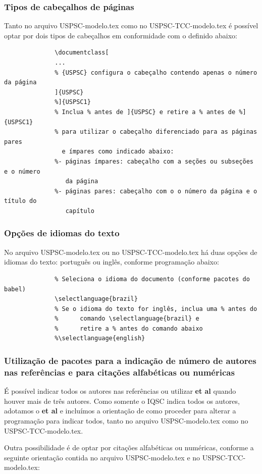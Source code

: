 \subsubsection{Tipos de cabeçalhos de páginas} 
Tanto no arquivo USPSC-modelo.tex como no USPSC-TCC-modelo.tex é possível optar por dois tipos de cabeçalhos em conformidade com o definido abaixo:
			  \begin{verbatim}
			  \documentclass[
			  ...
			  % {USPSC} configura o cabeçalho contendo apenas o número da página
			  ]{USPSC}
			  %]{USPSC1}
			  % Inclua % antes de ]{USPSC} e retire a % antes de %]{USPSC1}
			  % para utilizar o cabeçalho diferenciado para as páginas pares 
			    e ímpares como indicado abaixo:
			  %- páginas ímpares: cabeçalho com a seções ou subseções e o número 
			     da página
			  %- páginas pares: cabeçalho com o o número da página e o título do 
			     capítulo 
			  \end{verbatim}
\subsubsection{Opções de idiomas do texto} 
No arquivo USPSC-modelo.tex ou no USPSC-TCC-modelo.tex há duas opções de idiomas do texto: português ou inglês, conforme programação abaixo:			  
			  \begin{verbatim}
			  % Seleciona o idioma do documento (conforme pacotes do babel)
			  \selectlanguage{brazil}
			  % Se o idioma do texto for inglês, inclua uma % antes do 
			  %      comando \selectlanguage{brazil} e 
			  %      retire a % antes do comando abaixo
			  %\selectlanguage{english}			  
			  \end{verbatim}
\subsubsection{Utilização de pacotes para a indicação de número de autores nas referências e para citações alfabéticas ou numéricas}
É possível indicar todos os autores nas referências ou utilizar \textbf{et al} quando houver mais de três autores. Como somente o IQSC indica todos os autores, adotamos o \textbf{et al} e incluímos a orientação de como proceder para alterar a programação para indicar todos, tanto no arquivo USPSC-modelo.tex como no USPSC-TCC-modelo.tex.

Outra possibilidade é de optar por citações alfabéticas ou numéricas, conforme a seguinte orientação contida no arquivo USPSC-modelo.tex e no USPSC-TCC-modelo.tex:	
		  
